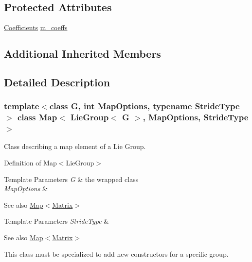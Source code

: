 \subsection*{Protected Attributes}
\begin{DoxyCompactItemize}
\item 
\hyperlink{class_map_3_01_lie_group_3_01_g_01_4_00_01_map_options_00_01_stride_type_01_4_a3140b440390b3c15c7361ab182a91f91}{Coefficients} \hyperlink{class_map_3_01_lie_group_3_01_g_01_4_00_01_map_options_00_01_stride_type_01_4_ab567fb9415879d9fa0fcf35465dc0beb}{m\+\_\+coeffs}
\end{DoxyCompactItemize}
\subsection*{Additional Inherited Members}


\subsection{Detailed Description}
\subsubsection*{template$<$class G, int Map\+Options, typename Stride\+Type$>$\newline
class Map$<$ Lie\+Group$<$ G $>$, Map\+Options, Stride\+Type $>$}

Class describing a map element of a Lie Group. 

Definition of Map$<$\+Lie\+Group$>$


\begin{DoxyTemplParams}{Template Parameters}
{\em G} & the wrapped class \\
\hline
{\em Map\+Options} & \\
\hline
\end{DoxyTemplParams}
\begin{DoxySeeAlso}{See also}
\hyperlink{class_map_3_01_lie_group_3_01_g_01_4_00_01_map_options_00_01_stride_type_01_4_a141753f9a4186911b53b5b25cfd716ed}{Map$<$\+Matrix$>$} 
\end{DoxySeeAlso}

\begin{DoxyTemplParams}{Template Parameters}
{\em Stride\+Type} & \\
\hline
\end{DoxyTemplParams}
\begin{DoxySeeAlso}{See also}
\hyperlink{class_map_3_01_lie_group_3_01_g_01_4_00_01_map_options_00_01_stride_type_01_4_a141753f9a4186911b53b5b25cfd716ed}{Map$<$\+Matrix$>$}
\end{DoxySeeAlso}
This class must be specialized to add new constructors for a specific group.

